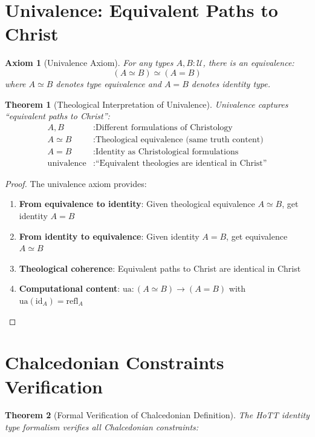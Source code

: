 \documentclass{article}
\newtheorem{theorem}{Theorem}
\newtheorem{axiom}{Axiom}
\begin{document}
\section{Univalence: Equivalent Paths to Christ}

\begin{axiom}[Univalence Axiom]
For any types $A, B : \mathcal{U}$, there is an equivalence:
\[
(A \simeq B) \simeq (A = B)
\]
where $A \simeq B$ denotes type equivalence and $A = B$ denotes identity type.
\end{axiom}

\begin{theorem}[Theological Interpretation of Univalence]
Univalence captures ``equivalent paths to Christ'':
\begin{align*}
A, B &: \text{Different formulations of Christology} \\
A \simeq B &: \text{Theological equivalence (same truth content)} \\
A = B &: \text{Identity as Christological formulations} \\
\text{univalence} &: \text{``Equivalent theologies are identical in Christ''}
\end{align*}
\end{theorem}

\begin{proof}
The univalence axiom provides:
\begin{enumerate}
    \item \textbf{From equivalence to identity}: Given theological equivalence $A \simeq B$, get identity $A = B$
    \item \textbf{From identity to equivalence}: Given identity $A = B$, get equivalence $A \simeq B$
    \item \textbf{Theological coherence}: Equivalent paths to Christ are identical in Christ
    \item \textbf{Computational content}: $\mathrm{ua} : (A \simeq B) \to (A = B)$ with $\mathrm{ua}(\mathrm{id}_A) = \mathrm{refl}_A$
\end{enumerate}
\end{proof}

\section{Chalcedonian Constraints Verification}

\begin{theorem}[Formal Verification of Chalcedonian Definition]
The HoTT identity type formalism verifies all Chalcedonian constraints:
\end{theorem}
\end{document}
